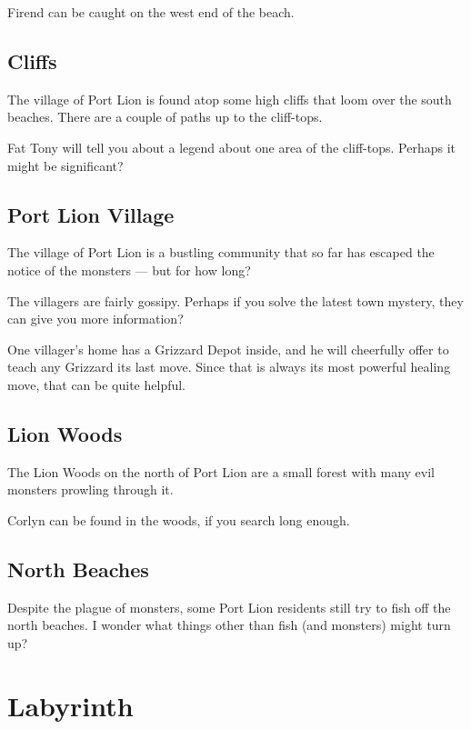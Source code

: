\documentclass[10pt,twocolumn]{memoir}
\begin{document}
Firend can be caught on the west end of the beach.

\subsection{Cliffs}

The village  of Port  Lion is  found atop some  high cliffs  that loom  over the
south beaches. There are a couple of paths up to the cliff-tops.

Fat  Tony will  tell  you about  a  legend  about one  area  of the  cliff-tops.
Perhaps it might be significant?

\subsection{Port Lion Village}

The village  of Port Lion is  a bustling community  that so far has  escaped the
notice of the monsters --- but for how long?

The villagers are fairly gossipy. Perhaps  if you solve the latest town mystery,
they can give you more information?

One villager's home has a Grizzard Depot inside, and he will cheerfully offer to
teach any Grizzard its last move. Since that is always its most powerful healing
move, that can be quite helpful.

\subsection{Lion Woods}

The Lion  Woods on  the north of  Port Lion  are a small  forest with  many evil
monsters prowling through it.

Corlyn can be found in the woods, if you search long enough.

\subsection{North Beaches}

Despite the plague of  monsters, some Port Lion residents still  try to fish off
the north  beaches. I wonder  what things other  than fish (and  monsters) might
turn up?

\section{Labyrinth}
\end{document}
